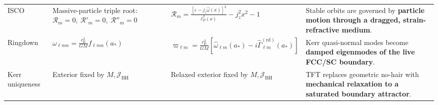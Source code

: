\begin{longtable}{@{} p{3cm} p{4.5cm} p{4.5cm} p{4cm} @{}}
ISCO & Massive-particle triple root: $\mathcal{R}_m=0,\ \mathcal{R}'_m=0,\ \mathcal{R}''_m=0$ & $\mathcal{R}_m = \frac{[\varepsilon-j_z\widehat{\omega}(x)]^2}{\widehat{c}_P^2(x)} - j_z^2x^2 - 1$ & Stable orbits are governed by \textbf{particle motion through a dragged, strain-refractive medium}. \\

Ringdown & $\omega_{\ell mn} = \frac{c_{\mathrm{E}}^3}{GM}f_{\ell mn}(a_\ast)$ & $\varpi_{\ell m} = \frac{c_{\mathrm{E}}^3}{GM}\left[\widehat{\omega}_{\ell m}(a_\ast)-i\widehat{\Gamma}^{(\mathrm{rd})}_{\ell m}(a_\ast)\right]$ & Kerr quasi-normal modes become \textbf{damped eigenmodes of the live FCC/SC boundary}. \\

Kerr uniqueness & Exterior fixed by $M, \mathcal{J}_{\mathrm{BH}}$ & Relaxed exterior fixed by $M, \mathcal{J}_{\mathrm{BH}}$ & TFT replaces geometric no-hair with \textbf{mechanical relaxation to a saturated boundary attractor}. \\

\bottomrule
\end{longtable}
